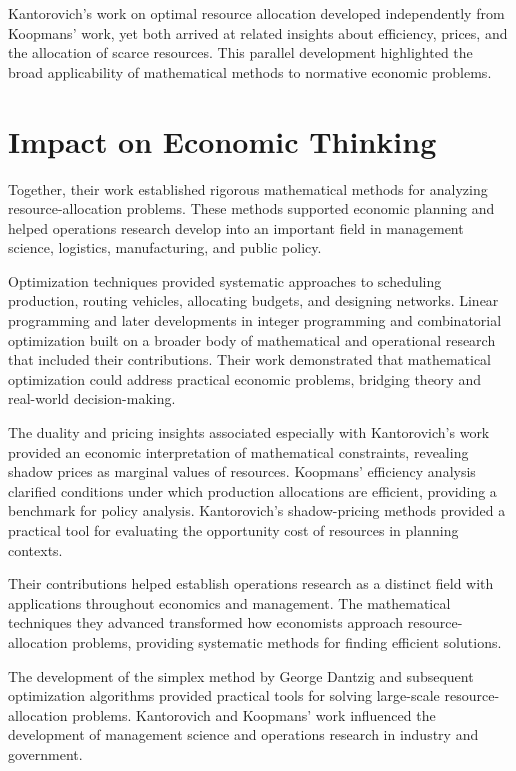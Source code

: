 Kantorovich's work on optimal resource allocation developed independently from Koopmans' work,
yet both arrived at related insights about efficiency, prices, and the allocation of scarce
resources. This parallel development highlighted the broad applicability of mathematical methods
to normative economic problems.

\section{Impact on Economic Thinking}
Together, their work established rigorous mathematical methods for analyzing resource-allocation
problems. These methods supported economic planning and helped operations research develop into an
important field in management science, logistics, manufacturing, and public policy.

Optimization techniques provided systematic approaches to scheduling production, routing vehicles,
allocating budgets, and designing networks. Linear programming and later developments in integer
programming and combinatorial optimization built on a broader body of mathematical and operational
research that included their contributions. Their work demonstrated that mathematical optimization
could address practical economic problems, bridging theory and real-world decision-making.

The duality and pricing insights associated especially with Kantorovich's work provided an economic
interpretation of mathematical constraints, revealing shadow prices as marginal values of
resources. Koopmans' efficiency analysis clarified conditions under which production allocations
are efficient, providing a benchmark for policy analysis. Kantorovich's shadow-pricing methods
provided a practical tool for evaluating the opportunity cost of resources in planning contexts.

Their contributions helped establish operations research as a distinct field with applications
throughout economics and management. The mathematical techniques they advanced transformed how
economists approach resource-allocation problems, providing systematic methods for finding
efficient solutions.

The development of the simplex method by George Dantzig and subsequent optimization algorithms
provided practical tools for solving large-scale resource-allocation problems. Kantorovich and
Koopmans' work influenced the development of management science and operations research in
industry and government.

